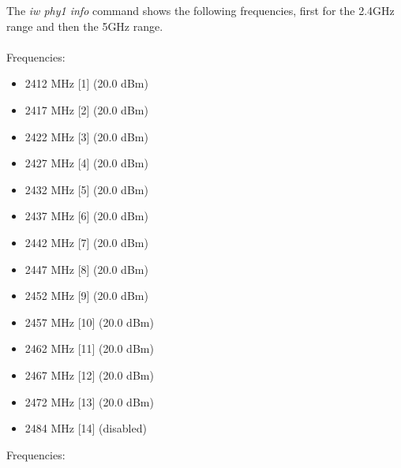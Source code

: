 The \textit{iw phy1 info} command shows the following frequencies, first for the 2.4GHz range and then the 5GHz range.\\ \\ 
Frequencies:\\
\begin{itemize}
\item 2412 MHz [1] (20.0 dBm)
\item 2417 MHz [2] (20.0 dBm)
\item 2422 MHz [3] (20.0 dBm)
\item 2427 MHz [4] (20.0 dBm)
\item 2432 MHz [5] (20.0 dBm)
\item 2437 MHz [6] (20.0 dBm)
\item 2442 MHz [7] (20.0 dBm)
\item 2447 MHz [8] (20.0 dBm)
\item 2452 MHz [9] (20.0 dBm)
\item 2457 MHz [10] (20.0 dBm)
\item 2462 MHz [11] (20.0 dBm)
\item 2467 MHz [12] (20.0 dBm)
\item 2472 MHz [13] (20.0 dBm)
\item 2484 MHz [14] (disabled)
\end{itemize}
Frequencies:\\
